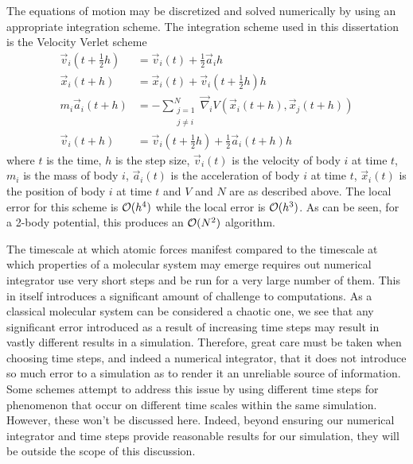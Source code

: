 %
The equations of motion may be discretized and solved numerically
by using an appropriate integration scheme.
The integration scheme used in this dissertation is
the Velocity Verlet scheme
\begin{align}
\label{eqn:velocity_verlet_scheme}
    \vec{v}_i(t + \tfrac{1}{2} h) &=
        \vec{v}_i(t) + \tfrac{1}{2}\vec{a}_i h
    \\
    \vec{x}_i(t + h) &=
        \vec{x}_i(t) + \vec{v}_i(t + \tfrac{1}{2} h) h
    \\
    m_i \vec{a}_i(t + h) &=
        - \sum_{\substack{j=1\\j\ne{}i}}^N
            \vec{\nabla}_i V(\vec{x}_i(t+h), \vec{x}_j(t+h))
    \\
    \vec{v}_i(t+h) &=
        \vec{v}_i(t + \tfrac{1}{2} h) + \tfrac{1}{2} \vec{a}_i(t + h) h
\end  {align}
where $t$ is the time,
$h$ is the step size,
$\vec{v}_i(t)$ is the velocity of body $i$ at time $t$,
$m_i$ is the mass of body $i$,
$\vec{a}_i(t)$ is the acceleration of body $i$ at time $t$,
$\vec{x}_i(t)$ is the position of body $i$ at time $t$ and
$V$ and $N$ are as described above.
%
The local error for this scheme is $\mathcal{O}{(h^4)}$ while the local error
is $\mathcal{O}{(h^3)}$.
%
As can be seen, for a 2-body potential,
this produces an $\mathcal{O}{(N^2)}$ algorithm.

%
The timescale at which atomic forces manifest compared to
the timescale at which properties of a molecular system may emerge
requires out numerical integrator use very short steps and be run for
a very large number of them.
%
This in itself introduces a significant amount of challenge to computations.
%
As a classical molecular system can be considered a chaotic one,
we see that any significant error introduced as a result of
increasing time steps may result in
vastly different results in a simulation.
%
Therefore, great care must be taken when choosing time steps, and
indeed a numerical integrator,
that it does not introduce so much error to a simulation as to render it
an unreliable source of information.
%
Some schemes attempt to address this issue by
using different time steps for phenomenon that occur on
different time scales within the same simulation.
%
However, these won’t be discussed here.
%
Indeed, beyond ensuring our numerical integrator and time steps provide
reasonable results for our simulation,
they will be outside the scope of this discussion.



